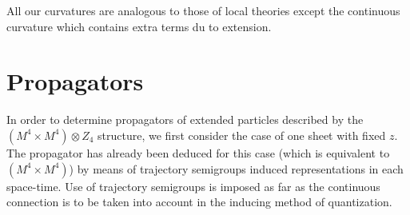 \documentclass[12pt,a4paper]{article}
\begin{document}
All our curvatures are analogous to those of local theories\cite{Konisi
1996,Kubo 1998} except the continuous curvature which contains extra terms du
to extension.

\section{Propagators}

In order to determine propagators of extended particles described by the
$\left(  M^{4}\times M^{4}\right)  \otimes Z_{4}$ structure, we first consider
the case of one sheet with fixed $z$. The propagator has already been deduced
for this case (which is equivalent to $\left(  M^{4}\times M^{4}\right)  $) by
means of trajectory semigroups induced representations in each
space-time.\cite{Smida 1998} Use of trajectory semigroups is imposed as far as
the continuous connection is to be taken into account in the inducing method
of quantization.
\end{document}
